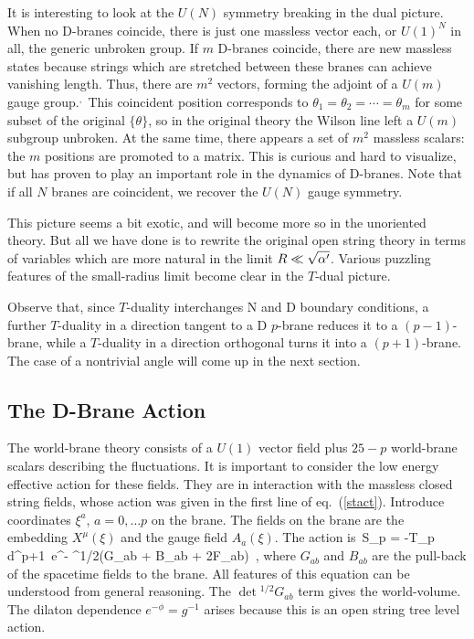 It is interesting to look at the $U(N)$ symmetry breaking in the dual
picture.  When no D-branes coincide, there is just one massless vector
each, or $U(1)^N$ in all, the generic unbroken group.  If $m$
D-branes coincide, there are new massless states because
strings which are stretched between these branes
can achieve vanishing length.  Thus, there are $m^2$ vectors, forming
the adjoint of a $U(m)$ gauge group.\cite{joecomb}$^{\!,\,}$\cite{witbound}
This coincident position corresponds to 
$\theta_1=\theta_2=\cdots=\theta_m$ for some subset of the original
$\{\theta\}$, so in the original theory the Wilson line left a $U(m)$
subgroup unbroken. At the same time, there
appears a set of $m^2$ massless scalars: the $m$ positions are promoted
to a matrix.  This is curious and hard to visualize, but has proven to play
an important role in the dynamics of
D-branes.\cite{witbound}  Note that if all $N$
branes are coincident, we recover the $U(N)$ gauge symmetry.

This picture seems a bit exotic, and will become more so in the unoriented
theory.  But all we have done is to rewrite the original open string theory
in terms of variables which are more natural in the limit $R \ll
\sqrt{\alpha'}$.  Various puzzling features of the small-radius limit become
clear in the $T$-dual picture.

Observe that, since $T$-duality interchanges N and D boundary conditions, a
further $T$-duality in a direction tangent to a D $p$-brane reduces it to a
$(p-1)$-brane, while a $T$-duality in a direction orthogonal turns it into a
$(p+1)$-brane.  The case of a nontrivial angle will come up in the next
section.

\subsection{The D-Brane Action}

The world-brane
theory consists of a $U(1)$ vector field plus
$25-p$ world-brane scalars describing the fluctuations.  It is important to
consider the low energy effective action for these fields.
They are in
interaction with the massless closed string fields, whose action was given
in the first line of eq.~(\ref{stact}).
Introduce coordinates $\xi^a$, $a = 0, \ldots p$ on the brane.  The
fields on the brane are the embedding $X^\mu(\xi)$ and the gauge field
$A_a(\xi)$.  The action is\,\cite{leigh}
\be
S_p = -T_p \int d^{p+1}\xi\, e^{-\phi} \det\!^{1/2}\left(G_{ab} + B_{ab}
+ 2\pi\ap F_{ab}\right)\ , \label{dact}
\ee
where $G_{ab}$ and $B_{ab}$ are the pull-back of the spacetime fields to
the brane.  All features of this equation can be understood from general
reasoning.  The $\det\!^{1/2} G_{ab}$ term gives the world-volume. The
dilaton dependence $e^{-\phi} = g^{-1}$ arises because this is an open
string tree level action.

